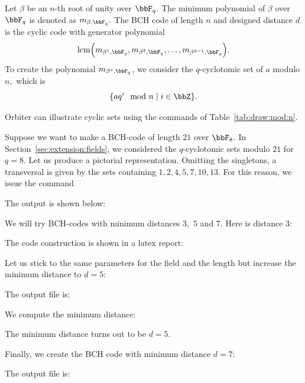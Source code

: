 
Let $\beta$ be an $n$-th root of unity over $\bbF_q$. 
The minimum polynomial of $\beta$ over $\bbF_q$ is denoted as $m_{\beta,\bbF_q}.$
The BCH code of length $n$ and designed distance $d$ is 
the cyclic code with generator polynomial 
$$
{\rm lcm}\Big(m_{\beta^1,\bbF_q}, m_{\beta^2,\bbF_q},\ldots, m_{\beta^{d-1},\bbF_q}\Big).
$$
To create the polynomial $m_{\beta^a,\bbF_q}$, 
we consider the $q$-cyclotomic set of $a$ modulo $n,$ 
which is 
$$
\{aq^i \mod n \mid i \in \bbZ \}.
$$

\bigskip

Orbiter can illustrate cyclic sets 
using the commands of Table~\ref{tab:draw:mod:n}.

\bigskip


Suppose we want to make a BCH-code of length $21$ over $\bbF_8.$
In Section~\ref{sec:extension:fields}, 
we considered the $q$-cyclotomic sets modulo $21$ for $q=8.$
Let us produce a pictorial representation. 
Omitting the singletons, a transversal is given by the 
sets containing $1,2,4,5,7,10,13.$ 
For this reason, we issue the command 



The output is shown below:

We will try BCH-codes with minimum distances $3,$ $5$ and $7$.
Here is distance $3$:


The code construction is shown in a latex report: 

\bigskip

Let us stick to the same parameters for the field and the length 
but increase the minimum distance to $d=5$:


The output file is:


We compute the minimum distance:


The minimum distance turns out to be $d=5$.


\bigskip

Finally, we create the BCH code with minimum distance $d=7$:


The output file is:



